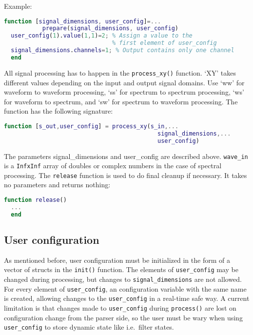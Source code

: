 \documentclass[11pt,a4paper,twoside]{article}
\newcommand{\+}{\discretionary{\mbox{\scriptsize$\hookleftarrow$}}{}{}}
\begin{document}
  Example:
\begin{lstlisting}[language=Matlab]
  function [signal_dimensions, user_config]=...
           prepare(signal_dimensions, user_config)
  user_config(1).value(1,1)=2; % Assign a value to the
                               % first element of user_config 
  signal_dimensions.channels=1; % Output contains only one channel
  end
\end{lstlisting}
All signal processing has to happen in the \texttt{process\_xy()} function. `XY' takes different values
depending on the input and output signal domains. Use `ww' for waveform to
waveform processing,  `ss' for spectrum to spectrum processing,  `ws' for waveform
to spectrum, and `sw' for spectrum to waveform processing. The function has the following signature:
\begin{lstlisting}[language=Matlab]
  function [s_out,user_config] = process_xy(s_in,...
                                            signal_dimensions,...
                                            user_config)
\end{lstlisting}
The parameters signal\_dimensions and user\_config are described above.
\texttt{wave\_in} is a \texttt{InfxInf} array of doubles or complex numbers in
the case of spectral processing.
The \texttt{release} function is used to do final cleanup if necessary.
It takes no parameters and returns nothing:
\begin{lstlisting}[language=Matlab]
  function release()
  ...
  end
\end{lstlisting}
\subsection{User configuration}
As mentioned before, user configuration must be initialized in the form of a
vector of structs in the \texttt{init()} function.
The elements of \texttt{user\_config} may be changed during processing,
but changes to \texttt{signal\_dimensions} are not allowed. 
For every element of \texttt{user\_config}, an \mha{} configuration variable
with the same name is created, allowing changes to the \texttt{user\_config} in
a real-time safe way.
A current limitation is that changes made to \texttt{user\_config} during \texttt{process()} are
lost on configuration change from the parser side, so the user must be wary when using \texttt{user\_config} to store
dynamic state like i.e.\ filter states.
\end{document}
